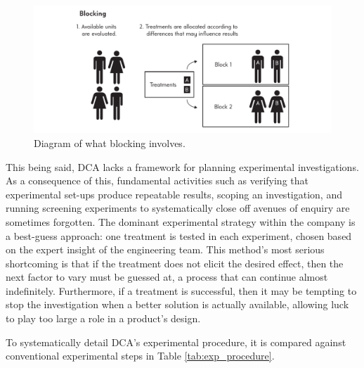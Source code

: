 \documentclass[11pt,a4paper,article]{memoir} %
\begin{document}
\begin{figure}
\includegraphics[width=\textwidth]{Blocking.pdf}
\caption{Diagram of what blocking involves.}
\label{fig:blocking}
\end{figure}
\par
This being said, DCA lacks a framework for planning experimental investigations. As a consequence of this, fundamental activities such as verifying that experimental set-ups produce repeatable results, scoping an investigation, and running screening experiments to systematically close off avenues of enquiry are sometimes forgotten. The dominant experimental strategy within the company is a best-guess approach: one treatment is tested in each experiment, chosen based on the expert insight of the engineering team. This method's most serious shortcoming is that if the treatment does not elicit the desired effect, then the next factor to vary must be guessed at, a process that can continue almost indefinitely. Furthermore, if a treatment is successful, then it may be tempting to stop the investigation when a better solution is actually available, allowing luck to play too large a role in a product's design.
\par
To systematically detail DCA's experimental procedure, it is compared against conventional experimental steps in Table \ref{tab:exp_procedure}.
\end{document}
